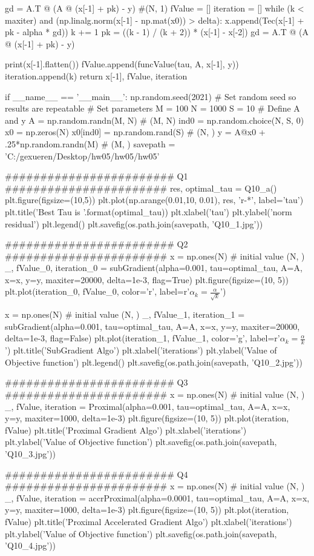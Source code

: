 \documentclass[12pt, a4 paper]{article}
\begin{document}
\begin{framed}
\begin{python}
    gd = A.T @ (A @ (x[-1] + pk) - y) #(N, 1)
    fValue = []
    iteration = []
    while (k < maxiter) and (np.linalg.norm(x[-1] - np.mat(x0)) > delta):
        x.append(Tec(x[-1] + pk - alpha * gd))
        k += 1
        pk = ((k - 1) / (k + 2)) * (x[-1] - x[-2])
        gd = A.T @ (A @ (x[-1] + pk) - y)

        print(x[-1].flatten())
        fValue.append(funcValue(tau, A, x[-1], y))
        iteration.append(k)
    return x[-1], fValue, iteration

if __name__ == '__main__':
    np.random.seed(2021) # Set random seed so results are repeatable # Set parameters
    M = 100
    N = 1000
    S = 10
    # Define A and y
    A = np.random.randn(M, N) # (M, N)
    ind0 = np.random.choice(N, S, 0)
    x0 = np.zeros(N)
    x0[ind0] = np.random.rand(S) # (N, )
    y = A@x0 + .25*np.random.randn(M) # (M, )
    savepath = 'C:/gexueren/Desktop/hw05/hw05/hw05'
    
    ######################## Q1 #######################
    res, optimal_tau = Q10_a()
    plt.figure(figsize=(10,5))
    plt.plot(np.arange(0.01,10, 0.01), res, 'r-*', label='tau')
    plt.title('Best Tau is {}'.format(optimal_tau))
    plt.xlabel('tau')
    plt.ylabel('norm residual')
    plt.legend()
    plt.savefig(os.path.join(savepath, 'Q10_1.jpg'))

    ######################## Q2 #######################
    x = np.ones(N) # initial value (N, )
    _, fValue_0, iteration_0 = subGradient(alpha=0.001, tau=optimal_tau, A=A, x=x, y=y, maxiter=20000, delta=1e-3, flag=True)
    plt.figure(figsize=(10, 5))
    plt.plot(iteration_0, fValue_0, color='r', label=r'$\alpha_{k}= \frac{\alpha}{\sqrt{k}}$')

    x = np.ones(N) # initial value (N, )
    _, fValue_1, iteration_1 = subGradient(alpha=0.001, tau=optimal_tau, A=A, x=x, y=y, maxiter=20000, delta=1e-3, flag=False)
    plt.plot(iteration_1, fValue_1, color='g', label=r'$\alpha_{k}= \frac{\alpha}{k}$')
    plt.title('SubGradient Algo')
    plt.xlabel('iterations')
    plt.ylabel('Value of Objective function')
    plt.legend()
    plt.savefig(os.path.join(savepath, 'Q10_2.jpg'))

    ######################## Q3 #######################
    x = np.ones(N) # initial value (N, )
    _, fValue, iteration = Proximal(alpha=0.001, tau=optimal_tau, A=A, x=x, y=y, maxiter=1000, delta=1e-3)
    plt.figure(figsize=(10, 5))
    plt.plot(iteration, fValue)
    plt.title('Proximal Gradient Algo')
    plt.xlabel('iterations')
    plt.ylabel('Value of Objective function')
    plt.savefig(os.path.join(savepath, 'Q10_3.jpg'))

    ######################## Q4 #######################
    x = np.ones(N) # initial value (N, )
    _, fValue, iteration = accrProximal(alpha=0.0001, tau=optimal_tau, A=A, x=x, y=y, maxiter=1000, delta=1e-3)
    plt.figure(figsize=(10, 5))
    plt.plot(iteration, fValue)
    plt.title('Proximal Accelerated Gradient Algo')
    plt.xlabel('iterations')
    plt.ylabel('Value of Objective function')
    plt.savefig(os.path.join(savepath, 'Q10_4.jpg'))
        \end{python}
    \end{framed}
\end{document}
